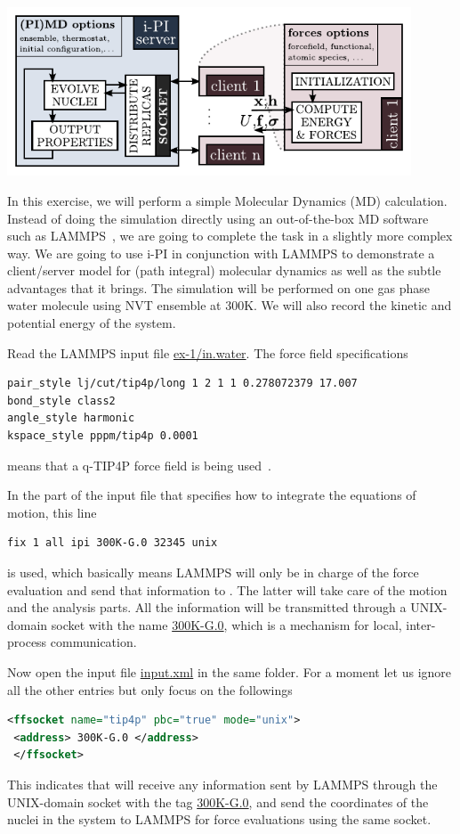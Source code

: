 \documentclass{article}
\begin{document}
\begin{Exercise}[label={i-pi},title={Molecular Dynamics: a client/server approach}]
{\centering\includegraphics[width=0.9\textwidth]{ipi-scheme.pdf}}

In this exercise, we will perform a simple Molecular Dynamics (MD) calculation.
Instead of doing the simulation directly using an out-of-the-box MD software such as LAMMPS~\cite{plim95jcp},
we are going to complete the task in a slightly more complex way.
We are going to use i-PI in conjunction with LAMMPS to demonstrate a client/server model 
for (path integral) molecular dynamics as well as the subtle advantages that it brings.
The simulation will be performed on one gas phase water molecule using NVT ensemble at 300K.
We will also record the kinetic and potential energy of the system.

\Question
Read the LAMMPS input file \url{ex-1/in.water}.
The force field specifications
\begin{lstlisting}[language=bash]
pair_style lj/cut/tip4p/long 1 2 1 1 0.278072379 17.007
bond_style class2 
angle_style harmonic
kspace_style pppm/tip4p 0.0001
\end{lstlisting}
means that a q-TIP4P force field is being used~\cite{habe+09jcp}.

In the part of the input file that specifies how to integrate the
equations of motion, this line
\begin{lstlisting}[language=bash]
fix 1 all ipi 300K-G.0 32345 unix
\end{lstlisting}
is used, which basically means LAMMPS will only be in charge of the 
force evaluation and send that information to \ipi{}.
The latter will take care of the motion and the analysis parts.
All the information will be transmitted through a UNIX-domain socket with the name \url{300K-G.0},
which is a mechanism for local, inter-process communication.

\Question
Now open the \ipi{} input file \url{input.xml} in the same folder.
For a moment let us ignore all the other entries but only focus on the followings
\begin{lstlisting}[language=xml]
 <ffsocket name="tip4p" pbc="true" mode="unix">
 <address> 300K-G.0 </address>
 </ffsocket>
\end{lstlisting}
This indicates that \ipi{} will receive any information sent by LAMMPS through the UNIX-domain socket with the tag \url{300K-G.0},
and send the coordinates of the nuclei in the system to LAMMPS for force evaluations using the same socket.


\end{Exercise}
\end{document}
